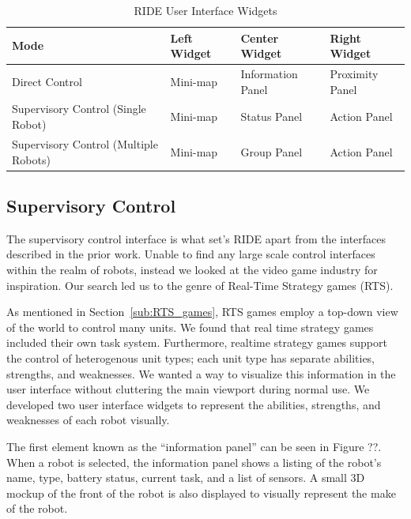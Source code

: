 \begin{table}[ht]
\label{tab:ui-widgets}
\begin{center}
    \begin{tabular}{ | p{4cm} | l | l | l |}
    \hline
    \textbf{Mode} & \textbf{Left Widget} & \textbf{Center Widget} & \textbf{Right Widget} \\ \hline
    Direct Control & Mini-map & Information Panel & Proximity Panel \\ \hline
    Supervisory Control (Single Robot) & Mini-map & Status Panel & Action Panel \\ \hline
    Supervisory Control (Multiple Robots) & Mini-map & Group Panel & Action Panel \\ \hline
    \hline
    \end{tabular}
    \caption{RIDE User Interface Widgets}
\end{center}
\end{table}

\subsection{Supervisory Control}
\label{subs:ui-supervisor}

The supervisory control interface is what set's RIDE apart from the interfaces described in the prior work. Unable to find any large scale control interfaces within the realm of robots, instead we looked at the video game industry for inspiration. Our search led us to the genre of Real-Time Strategy games (RTS). 

As mentioned in Section~\ref{sub:RTS_games}, RTS games employ a top-down view of the world to control many units. We found that real time strategy games included their own task system. Furthermore, realtime strategy games support the control of heterogenous unit types; each unit type has separate abilities, strengths, and weaknesses. We wanted a way to visualize this information in the user interface without cluttering the main viewport during normal use. We developed two user interface widgets to represent the abilities, strengths, and weaknesses of each robot visually.

The first element known as the ``information panel'' can be seen in Figure ??. When a robot is selected, the information panel shows a listing of the robot's name, type, battery status, current task, and a list of sensors. A small 3D mockup of the front of the robot is also displayed to visually represent the make of the robot.

